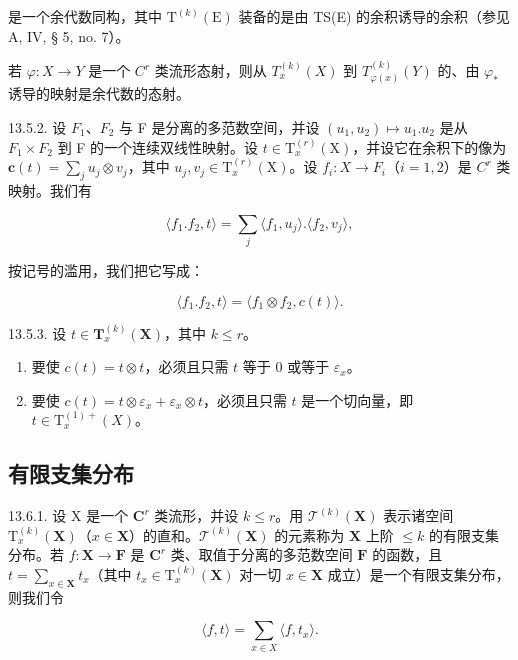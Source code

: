 是一个余代数同构，其中 \(\mathrm{T}^{(k)}(\mathrm{E})\) 装备的是由 TS(E) 的余积诱导的余积（参见 A, IV, § 5, no. 7）。

若 \(\varphi: X \to Y\) 是一个 \(C^r\) 类流形态射，则从 \(T_x^{(k)}(X)\) 到 \(T_{\varphi(x)}^{(k)}(Y)\) 的、由 \(\varphi_*\) 诱导的映射是余代数的态射。

13.5.2. 设 \(F_{1}\)、\(F_{2}\) 与 F 是分离的多范数空间，并设 \((u_{1}, u_{2}) \mapsto u_{1}.u_{2}\) 是从 \(F_{1} \times F_{2}\) 到 F 的一个连续双线性映射。设 \(t \in \mathrm{T}_{x}^{(r)}(\mathrm{X})\)，并设它在余积下的像为 \(\boldsymbol{c}(t) = \sum_{j} u_{j} \otimes v_{j}\)，其中 \(u_{j},v_{j} \in \mathrm{T}_{x}^{(r)}(\mathrm{X})\)。设 \(f_{i}: X \to F_{i}\)（\(i=1,2\)）是 \(C^{r}\) 类映射。我们有

\[
\langle f _ {1}. f _ {2}, t \rangle = \sum_ {j} \langle f _ {1}, u _ {j} \rangle . \langle f _ {2}, v _ {j} \rangle ,
\]

按记号的滥用，我们把它写成：

\[
\langle f _ {1}. f _ {2}, t \rangle = \langle f _ {1} \otimes f _ {2}, c (t) \rangle .
\]

13.5.3. 设 \(t \in \mathbf{T}_x^{(k)}(\mathbf{X})\)，其中 \(k \leqslant r\)。

\begin{enumerate}
\def\labelenumi{\alph{enumi})}
\item
  要使 \(c(t)=t\otimes t\)，必须且只需 \(t\) 等于 0 或等于 \(\varepsilon_{x}\)。
\item
  要使 \(c(t)=t\otimes\varepsilon_{x}+\varepsilon_{x}\otimes t\)，必须且只需 \(t\) 是一个切向量，即 \(t\in\mathrm{T}_{x}^{(1)+}(X)\)。
\end{enumerate}

\subsection{有限支集分布}

13.6.1. 设 X 是一个 \(\mathbf{C}^r\) 类流形，并设 \(k \leqslant r\)。用 \(\mathcal{T}^{(k)}(\mathbf{X})\) 表示诸空间 \(\mathrm{T}_x^{(k)}(\mathbf{X})\)（\(x \in \mathbf{X}\)）的直和。\(\mathcal{T}^{(k)}(\mathbf{X})\) 的元素称为 \(\mathbf{X}\) 上阶 \(\leqslant k\) 的有限支集分布。若 \(f: \mathbf{X} \to \mathbf{F}\) 是 \(\mathbf{C}^r\) 类、取值于分离的多范数空间 \(\mathbf{F}\) 的函数，且 \(t = \sum_{x \in \mathbf{X}} t_x\)（其中 \(t_x \in \mathrm{T}_x^{(k)}(\mathbf{X})\) 对一切 \(x \in \mathbf{X}\) 成立）是一个有限支集分布，则我们令

\[
\langle f, t \rangle = \sum_ {x \in X} \langle f, t _ {x} \rangle .
\]

